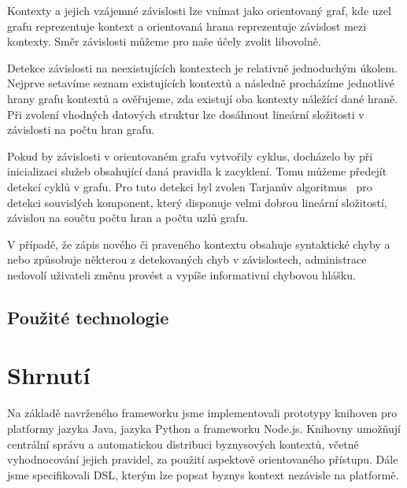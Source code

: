 Kontexty a jejich vzájemné závislosti lze vnímat jako
orientovaný graf, kde uzel grafu reprezentuje kontext
a orientovaná hrana reprezentuje závislost mezi kontexty.
Směr závislosti můžeme pro naše účely zvolit libovolně.

Detekce závislosti na neexistujících kontextech je relativně
jednoduchým úkolem. Nejprve setavíme seznam existujících kontextů
a následně procházíme jednotlivé hrany grafu kontextů a ověřujeme,
zda existují oba kontexty náležící dané hraně.
Při zvolení vhodných datových struktur lze dosáhnout
lineární složitosti v závislosti na počtu hran grafu.

Pokud by závislosti v orientovaném grafu vytvořily cyklus,
docházelo by při inicializaci služeb
obsahující daná pravidla k zacyklení. Tomu můžeme předejít
detekcí cyklů v grafu. Pro tuto detekci byl zvolen
Tarjanův algoritmus~\cite{tarjan1971depth} pro detekci souvislých
komponent, který disponuje velmi dobrou lineární složitostí,
závislou na součtu počtu hran a počtu uzlů grafu.

V případě, že zápis nového či praveného kontextu obsahuje syntaktické
chyby a nebo způsobuje některou z detekovaných chyb v závislostech,
administrace nedovolí uživateli změnu provést a vypíše informativní
chybovou hlášku.

\subsection{Použité technologie}


\section{Shrnutí}

Na základě navrženého frameworku jsme implementovali prototypy
knihoven pro platformy jazyka Java, jazyka Python a frameworku
Node.js. Knihovny umožňují centrální správu a automatickou distribuci
byznysových kontextů, včetně vyhodnocování jejich pravidel, za
použití aspektově orientovaného přístupu.
Dále jsme specifikovali DSL, kterým lze popsat byznys kontext
nezávisle na platformě.

